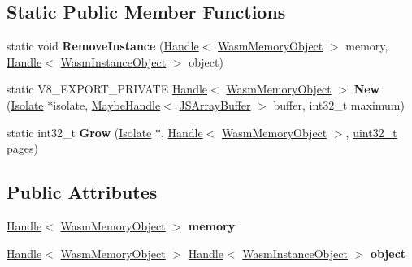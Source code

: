 \subsection*{Static Public Member Functions}
\begin{DoxyCompactItemize}
\item 
\mbox{\label{classv8_1_1internal_1_1WasmMemoryObject_a29910ceb1c03b6b7800c5b39f7f9ad8f}} 
static void {\bfseries Remove\+Instance} (\mbox{\hyperlink{classv8_1_1internal_1_1Handle}{Handle}}$<$ \mbox{\hyperlink{classv8_1_1internal_1_1WasmMemoryObject}{Wasm\+Memory\+Object}} $>$ memory, \mbox{\hyperlink{classv8_1_1internal_1_1Handle}{Handle}}$<$ \mbox{\hyperlink{classv8_1_1internal_1_1WasmInstanceObject}{Wasm\+Instance\+Object}} $>$ object)
\item 
\mbox{\label{classv8_1_1internal_1_1WasmMemoryObject_a6538e4d8e66a941190df60cae222a8c3}} 
static V8\+\_\+\+E\+X\+P\+O\+R\+T\+\_\+\+P\+R\+I\+V\+A\+TE \mbox{\hyperlink{classv8_1_1internal_1_1Handle}{Handle}}$<$ \mbox{\hyperlink{classv8_1_1internal_1_1WasmMemoryObject}{Wasm\+Memory\+Object}} $>$ {\bfseries New} (\mbox{\hyperlink{classv8_1_1internal_1_1Isolate}{Isolate}} $\ast$isolate, \mbox{\hyperlink{classv8_1_1internal_1_1MaybeHandle}{Maybe\+Handle}}$<$ \mbox{\hyperlink{classv8_1_1internal_1_1JSArrayBuffer}{J\+S\+Array\+Buffer}} $>$ buffer, int32\+\_\+t maximum)
\item 
\mbox{\label{classv8_1_1internal_1_1WasmMemoryObject_af25cf1da2d298a8c13bf9c7cf5f1334d}} 
static int32\+\_\+t {\bfseries Grow} (\mbox{\hyperlink{classv8_1_1internal_1_1Isolate}{Isolate}} $\ast$, \mbox{\hyperlink{classv8_1_1internal_1_1Handle}{Handle}}$<$ \mbox{\hyperlink{classv8_1_1internal_1_1WasmMemoryObject}{Wasm\+Memory\+Object}} $>$, \mbox{\hyperlink{classuint32__t}{uint32\+\_\+t}} pages)
\end{DoxyCompactItemize}
\subsection*{Public Attributes}
\begin{DoxyCompactItemize}
\item 
\mbox{\label{classv8_1_1internal_1_1WasmMemoryObject_a0fa12659e24b0892dfa66c856612edca}} 
\mbox{\hyperlink{classv8_1_1internal_1_1Handle}{Handle}}$<$ \mbox{\hyperlink{classv8_1_1internal_1_1WasmMemoryObject}{Wasm\+Memory\+Object}} $>$ {\bfseries memory}
\item 
\mbox{\label{classv8_1_1internal_1_1WasmMemoryObject_abd6c301526e7814e678d8bb84a52c5ee}} 
\mbox{\hyperlink{classv8_1_1internal_1_1Handle}{Handle}}$<$ \mbox{\hyperlink{classv8_1_1internal_1_1WasmMemoryObject}{Wasm\+Memory\+Object}} $>$ \mbox{\hyperlink{classv8_1_1internal_1_1Handle}{Handle}}$<$ \mbox{\hyperlink{classv8_1_1internal_1_1WasmInstanceObject}{Wasm\+Instance\+Object}} $>$ {\bfseries object}
\end{DoxyCompactItemize}
